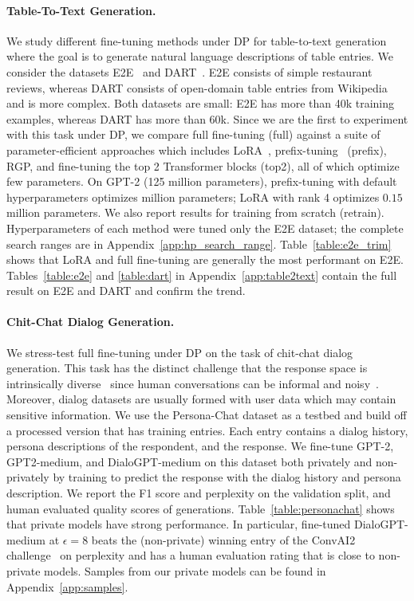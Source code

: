 \paragraph{Table-To-Text Generation.}
We study different fine-tuning methods under DP for table-to-text generation where the goal is to generate natural language descriptions of table entries. 
We consider the datasets E2E~\citep{novikova2017e2e} and DART~\citep{nan2020dart}. 
E2E consists of simple restaurant reviews, whereas DART consists of open-domain table entries from Wikipedia and is more complex. 
Both datasets are small: E2E has more than 40k training examples, whereas DART has more than 60k.
Since we are the first to experiment with this task under DP, we compare full fine-tuning (full) against a suite of parameter-efficient approaches which includes LoRA~\citep{hu2021lora}, prefix-tuning~\citep{li2021prefix} (prefix), RGP, and fine-tuning the top 2 Transformer blocks (top2), all of which optimize few parameters. 
On GPT-2 (125 million parameters), prefix-tuning with default hyperparameters optimizes  million parameters; LoRA with rank 4 optimizes \mytextapprox$0.15$  million parameters. 
We also report results for training from scratch (retrain).
Hyperparameters of each method were tuned only the E2E dataset; the complete search ranges are in Appendix~\ref{app:hp_search_range}.
Table~\ref{table:e2e_trim} shows that LoRA and full fine-tuning are generally the most performant on E2E. 
Tables~\ref{table:e2e} and \ref{table:dart} in Appendix~\ref{app:table2text} contain the full result on E2E and DART and confirm the trend.


\paragraph{Chit-Chat Dialog Generation.}
We stress-test full fine-tuning under DP on the task of chit-chat dialog generation. This task has the distinct challenge that the response space is intrinsically diverse~\citep{li2015diversity,gao2018neural} since human conversations can be informal and noisy~\citep{zhang2019dialogpt}.
Moreover, dialog datasets are usually formed with user data which may contain sensitive information.
We use the Persona-Chat dataset \citep{zhang2018personalizing} as a testbed and build off a processed version that has  training entries.
Each entry contains a dialog history, persona descriptions of the respondent, and the response. 
We fine-tune GPT-2, GPT2-medium, and DialoGPT-medium on this dataset both privately and non-privately by training to predict the response with the dialog history and persona description. 
We report the F1 score and perplexity on the validation split, and human evaluated quality scores of generations.
Table~\ref{table:personachat} shows that private models have strong performance. 
In particular, fine-tuned DialoGPT-medium at $\epsilon=8$ beats the (non-private) winning entry of the ConvAI2 challenge~\citep{dinan2019second} on perplexity and has a human evaluation rating that is close to non-private models.
Samples from our private models can be found in Appendix~\ref{app:samples}.


